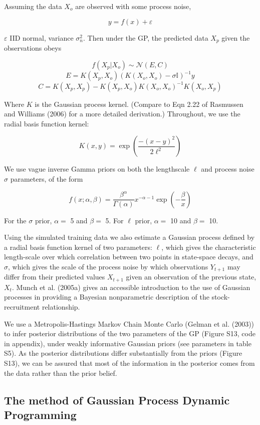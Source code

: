 \documentclass[]{components/elsarticle}
\begin{document}
Assuming the data $X_o$ are observed with some process noise,

\[y = f(x) + \varepsilon\]

$\varepsilon$ IID normal, variance $\sigma_n^2$. Then under the GP, the
predicted data $X_p$ given the observations obeys

\[f(X_p|X_o) \sim \mathcal{N}(E,C)\]
\[E = K(X_p, X_o) \left(K(X_o,X_o) - \sigma \mathbb{I} \right)  ^{-1} y\]
\[C = K(X_p, X_p) - K(X_p, X_o) K(X_o,X_o)^{-1} K(X_o, X_p)\]

Where $K$ is the Gaussian process kernel. (Compare to Eqn 2.22 of
Rasmussen and Williams (2006) for a more detailed derivation.)
Throughout, we use the radial basis function kernel:

\[ K(x,y) = \exp\left(\frac{-(x-y)^2}{2 \ell^2} \right)\]

We use vague inverse Gamma priors on both the lengthscale $\ell$ and
process noise $\sigma$ parameters, of the form

\[f(x; \alpha, \beta) = \frac{\beta^\alpha}{\Gamma(\alpha)} x^{-\alpha - 1}\exp\left(-\frac{\beta}{x}\right)\]

For the $\sigma$ prior, $\alpha = $ 5 and $\beta = $ 5. For $\ell$
prior, $\alpha = $ 10 and $\beta = $ 10.

Using the simulated training data we also estimate a Gaussian process
defined by a radial basis function kernel of two parameters: $\ell$,
which gives the characteristic length-scale over which correlation
between two points in state-space decays, and $\sigma$, which gives the
scale of the process noise by which observations $Y_{t+1}$ may differ
from their predicted values $X_{t+1}$ given an observation of the
previous state, $X_t$. Munch et al. (2005a) gives an accessible
introduction to the use of Gaussian processes in providing a Bayesian
nonparametric description of the stock-recruitment relationship.

We use a Metropolis-Hastings Markov Chain Monte Carlo (Gelman et al.
(2003)) to infer posterior distributions of the two parameters of the GP
(Figure S13, code in appendix), under weakly informative Gaussian priors
(see parameters in table S5). As the posterior distributions differ
substantially from the priors (Figure S13), we can be assured that most
of the information in the posterior comes from the data rather than the
prior belief.

\subsection{The method of Gaussian Process Dynamic
Programming}\label{the-method-of-gaussian-process-dynamic-programming}
\end{document}
